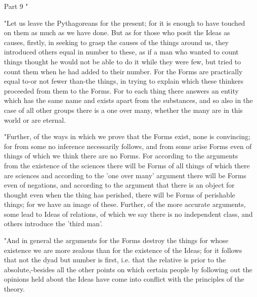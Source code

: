 Part 9 "

"Let us leave the Pythagoreans for the present; for it is enough to
have touched on them as much as we have done. But as for those who
posit the Ideas as causes, firstly, in seeking to grasp the causes
of the things around us, they introduced others equal in number to
these, as if a man who wanted to count things thought he would not
be able to do it while they were few, but tried to count them when
he had added to their number. For the Forms are practically equal
to-or not fewer than-the things, in trying to explain which these
thinkers proceeded from them to the Forms. For to each thing there
answers an entity which has the same name and exists apart from the
substances, and so also in the case of all other groups there is a
one over many, whether the many are in this world or are eternal.

"Further, of the ways in which we prove that the Forms exist, none
is convincing; for from some no inference necessarily follows, and
from some arise Forms even of things of which we think there are no
Forms. For according to the arguments from the existence of the sciences
there will be Forms of all things of which there are sciences and
according to the 'one over many' argument there will be Forms even
of negations, and according to the argument that there is an object
for thought even when the thing has perished, there will be Forms
of perishable things; for we have an image of these. Further, of the
more accurate arguments, some lead to Ideas of relations, of which
we say there is no independent class, and others introduce the 'third
man'. 

"And in general the arguments for the Forms destroy the things for
whose existence we are more zealous than for the existence of the
Ideas; for it follows that not the dyad but number is first, i.e.
that the relative is prior to the absolute,-besides all the other
points on which certain people by following out the opinions held
about the Ideas have come into conflict with the principles of the
theory. 

